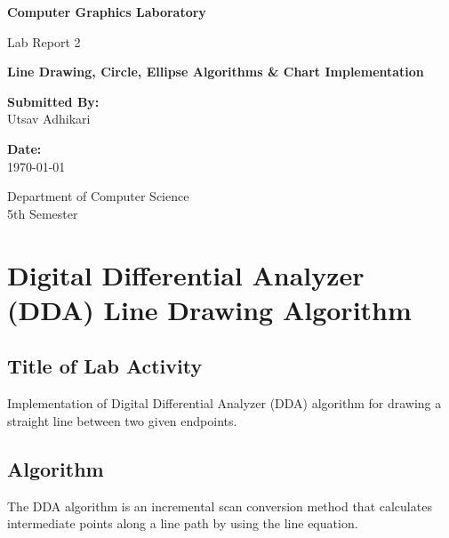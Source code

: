 \documentclass[12pt,a4paper]{article}
\begin{document}
\begin{titlepage}
    \centering
    \vspace*{1cm}
    
    \Huge
    \textbf{Computer Graphics Laboratory}
    
    \vspace{0.5cm}
    \LARGE
    Lab Report 2
    
    \vspace{1.5cm}
    
    \Large
    \textbf{Line Drawing, Circle, Ellipse Algorithms \& Chart Implementation}
    
    \vspace{2cm}
    
    \textbf{Submitted By:}\\
    \vspace{0.3cm}
    \Large
    Utsav Adhikari
    
    \vspace{2cm}
    
    \textbf{Date:}\\
    \vspace{0.3cm}
    \today
    
    \vfill
    
    \large
    Department of Computer Science\\
    5th Semester
    
\end{titlepage}

\tableofcontents
\newpage

\section{Digital Differential Analyzer (DDA) Line Drawing Algorithm}

\subsection{Title of Lab Activity}
Implementation of Digital Differential Analyzer (DDA) algorithm for drawing a straight line between two given endpoints.

\subsection{Algorithm}
The DDA algorithm is an incremental scan conversion method that calculates intermediate points along a line path by using the line equation.
\end{document}
